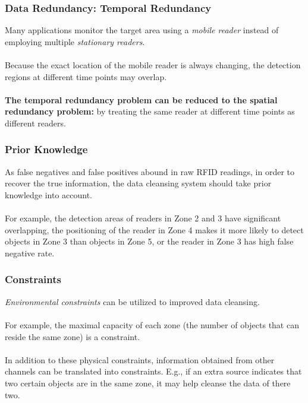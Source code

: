 \begin{frame}
\frametitle{Data Redundancy: Temporal Redundancy}

Many applications monitor the target area using a \emph{mobile reader} instead of employing multiple \emph{stationary readers}.\\~\\

Because the exact location of the mobile reader is always changing, the detection regions at different time points may overlap.\\~\\

\textbf{The temporal redundancy problem can be reduced to the spatial redundancy problem:} by treating the same reader at different time points as different readers.

\end{frame}


\begin{frame}
\frametitle{Prior Knowledge}

As false negatives and false positives abound in raw RFID readings, in order to recover the true information, the data cleansing system should take prior knowledge into account.\\~\\

For example, the detection areas of readers in Zone 2 and 3 have significant overlapping, the positioning of the reader in Zone 4 makes it more likely to detect objects in Zone 3 than objects in Zone 5, or the reader in Zone 3 has high false negative rate.

\end{frame}


\begin{frame}
\frametitle{Constraints}

\emph{Environmental constraints} can be utilized to improved data cleansing.\\~\\

For example, the maximal capacity of each zone (the number of objects that can reside the same zone) is a constraint.\\~\\

In addition to these physical constraints, information obtained from other channels can be translated into constraints. E.g., if an extra source indicates that two certain objects are in the same zone, it may help cleanse the data of there two.

\end{frame}

